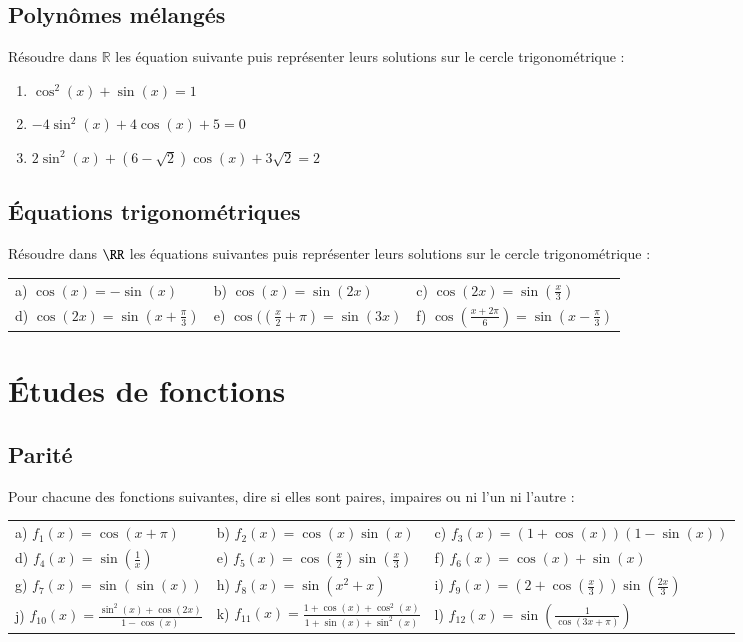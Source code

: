 \documentclass[oneside,12pt]{article}          %
\begin{document}
\subsection{Polynômes mélangés}
Résoudre dans $ \mathbb{R} $ les équation suivante puis représenter leurs solutions sur le cercle trigonométrique :
\begin{enumerate}
    \item $ \cos^2(x) + \sin(x) = 1 $
    \item $-4\sin^2(x)+4\cos(x)+5=0$
    \item $ 2\sin^2(x)+(6-\sqrt{2})\cos(x)+3\sqrt{2}=2$
\end{enumerate}



\subsection{Équations trigonométriques}
 Résoudre dans $\RR$ les équations suivantes puis représenter leurs solutions sur le cercle trigonométrique :

\begin{tabular}{p{} p{} p{}}

    a) $\cos(x)=-\sin(x)$ & b) $\cos(x)=\sin(2x)$ & c) $\cos(2x)=\sin(\frac{x}{3})$ \\
    d) $\cos(2x)=\sin(x+\frac{\pi}{3})$ & e) $\cos(\left(\frac{x}{2}+\pi\right)=\sin(3x)$ & f) $\cos\left(\frac{x+2\pi}{6}\right)=\sin\left(x-\frac{\pi}{3}\right)$
\end{tabular}



\section{Études de fonctions}

\subsection{Parité}
Pour chacune des fonctions suivantes, dire si elles sont paires, impaires ou ni l'un ni l'autre :

\begin{tabular}{p{} p{} p{}}
     a) $f_1(x)=\cos(x+\pi)$ & b) $f_2(x)=\cos(x)\sin(x)$ & c) $f_3(x)=(1+\cos(x))(1-\sin(x))$ \\
     d) $f_4(x)=\sin(\frac{1}{x})$ & e) $f_5(x)=\cos(\frac{x}{2})\sin(\frac{x}{3})$ & f) $f_6(x)=\cos(x)+\sin(x)$ \\
     g) $f_7(x)=\sin(\sin(x))$ & h) $f_8(x)=\sin(x^2+x)$ & i) $f_9(x)=\left(2+\cos\left(\frac{x}{3}\right)\right)\sin\left(\frac{2x}{3}\right)$ \\
     j) $f_{10}(x)=\frac{\sin^2(x)+\cos(2x)}{1-\cos(x)}$ & k) $f_{11}(x)=\frac{1+\cos(x)+\cos^2(x)}{1+\sin(x)+\sin^2(x)}$ & l) $f_{12}(x)=\sin\left(\frac{1}{\cos(3x+\pi)}\right)$
\end{tabular}
\end{document}
